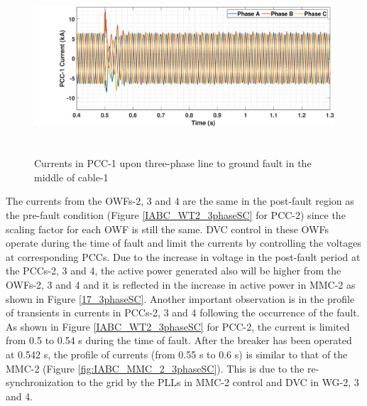 \begin{figure}[H]
    \includegraphics[height = 6.5cm,width = \textwidth]{Diagrams/Chapter_5/IABC_WT1_3phaseSC.eps}
    \caption{Currents in PCC-1 upon three-phase line to ground fault in the middle of cable-1}
    \label{WT1_currents_3phasefault}
\end{figure}


The currents from the \gls{OWF}s-2, 3 and 4 are the same in the post-fault region as the pre-fault condition (Figure \ref{IABC_WT2_3phaseSC} for \gls{PCC}-2) since the scaling factor for each \gls{OWF} is still the same. \gls{DVC} control in these \gls{OWF}s operate during the time of fault and limit the currents by controlling the voltages at corresponding \gls{PCC}s. Due to the increase in voltage in the post-fault period at the \gls{PCC}s-2, 3 and 4, the active power generated also will be higher from the \gls{OWF}s-2, 3 and 4 and it is reflected in the increase in active power in \gls{MMC}-2 as shown in Figure \ref{17_3phaseSC}. Another important observation is in the profile of transients in currents in \gls{PCC}s-2, 3 and 4 following the occurrence of the fault. As shown in Figure \ref{IABC_WT2_3phaseSC} for \gls{PCC}-2, the current is limited from 0.5 to 0.54 s during the time of fault. After the breaker has been operated at 0.542 s, the profile of currents (from 0.55 s to 0.6 s) is similar to that of the \gls{MMC}-2 (Figure \ref{fig:IABC_MMC_2_3phaseSC}). This is due to the re-synchronization to the grid by the \gls{PLL}s in \gls{MMC}-2 control and \gls{DVC} in \gls{WG}-2, 3 and 4. 

